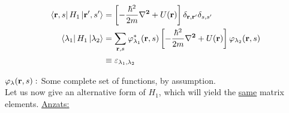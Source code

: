 \begin{align}
	\bra{\vb{r},s} H_1 \ket*{\vb{r'},s'} &= \left[-\frac{\hbar^2}{2m} \vb{\laplacian}+ U(\vb{r}) \right] \delta_{\vb{r}, \vb{r'}} \delta_{s,s'}\\
	\bra{\lambda_1} H_1 \ket{\lambda_2} &= \sum_{\vb{r},s} \varphi_{\lambda_1}^* (\vb{r},s) \left[-\frac{\hbar^2}{2m} \vb{\laplacian}+ U(\vb{r}) \right] \varphi_{\lambda_2} (\vb{r},s)\\
	&\equiv \varepsilon_{\lambda_1, \lambda_2} \nonumber
\end{align}

\noindent $\varphi_\lambda (\vb{r},s): $ Some complete set of functions, by assumption.\\
\linebreak
\noindent Let us now give an alternative form of $H_1$, which will yield the \uline{same} matrix elements.
\linebreak
\noindent \uline{Anzats:}

